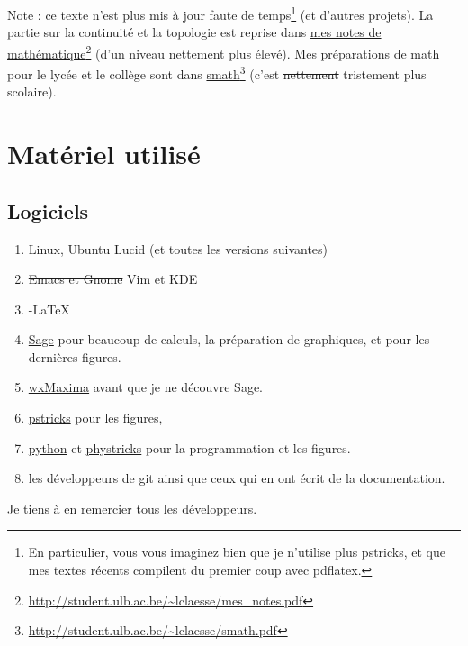 
Note : ce texte n'est plus mis à jour faute de temps\footnote{En particulier, vous vous imaginez bien que je n'utilise plus pstricks, et que mes textes récents compilent du premier coup avec pdflatex.} (et d'autres projets). La partie sur la continuité et la topologie est reprise dans \href{http://student.ulb.ac.be/~lclaesse/mes_notes.pdf}{mes notes de mathématique}\footnote{\url{http://student.ulb.ac.be/~lclaesse/mes_notes.pdf}} (d'un niveau nettement plus élevé). Mes préparations de math pour le lycée et le collège sont dans \href{http://student.ulb.ac.be/~lclaesse/smath.pdf}{smath}\footnote{\url{http://student.ulb.ac.be/~lclaesse/smath.pdf}} (c'est \st{nettement} tristement plus scolaire).

\section{Matériel utilisé}

\subsection{Logiciels}

\begin{enumerate}
	\item
		Linux, Ubuntu Lucid (et toutes les versions suivantes)
	\item
		\st{Emacs et Gnome} Vim et KDE	%
	\item
		\AmS-\LaTeX
	\item
		\href{www.sagemath.org}{Sage} pour beaucoup de calculs, la préparation de graphiques, et pour les dernières figures.
	\item 
		\href{http://maxima.sourceforge.net/}{wxMaxima} avant que je ne découvre Sage.
	\item 
		\href{http://fr.wikipedia.org/wiki/PSTricks}{pstricks} pour les figures,
	\item
		\href{http://fr.wikipedia.org/wiki/Python_(langage)}{python} et \href{http://student.ulb.ac.be/~lclaesse/phystricks-doc.pdf}{phystricks} pour la programmation et les figures.
	\item
		les développeurs de git ainsi que ceux qui en ont écrit de la documentation.
\end{enumerate}
Je tiens à en remercier tous les développeurs.
		
